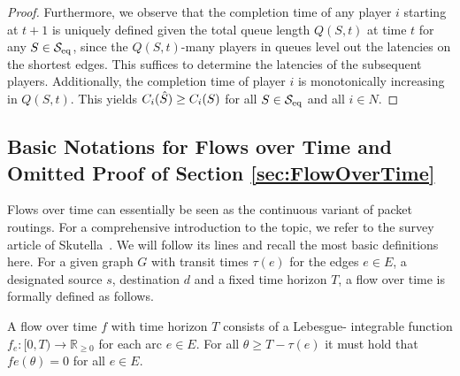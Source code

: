 \begin{proof}
\medskip
%
\noindent Furthermore, we observe that the completion time of any player $i$ starting at $t+1$ is uniquely defined given the total queue length $Q(S,t)$ at time $t$ for any $S\in \mathcal{S}_{\operatorname{eq}}$, since the $Q(S,t)$-many players in queues level out the latencies on the shortest edges. This suffices to determine the latencies of the subsequent players. Additionally, the completion time of player $i$ is monotonically increasing in $Q(S,t)$. This yields $C_i(\hat{S})\geq C_i(S)$ for all $S \in \mathcal{S}_{\operatorname{eq}}$ and all $i\in N$.
\end{proof}


\lemmaMnKStartpattern*
\noindent


\lemmaAddingEdges*
\noindent



\subsection{Basic Notations for Flows over Time and Omitted Proof of Section \ref{sec:FlowOverTime}}\label{app:FlowOverTime}

Flows over time can essentially be seen as the continuous variant of packet routings. For a comprehensive introduction to the topic, we refer to the survey article of Skutella~\cite{Skutella2009survey}. We will follow its lines and recall the most basic definitions here. For a given graph $G$ with transit times $\tau(e)$ for the edges $e \in E$, a designated source $s$, destination $d$ and a fixed time horizon $T$, a flow over time is formally defined as follows.

\begin{definition}
A flow over time $f$ with time horizon $T$ consists of a Lebesgue-
integrable function $f_e : [0, T) \rightarrow \mathbb{R}_{\geq 0}$ for each arc $e \in E$. For all $\theta \geq T - \tau(e)$ it must hold that $fe(\theta) = 0$ for all $e \in E$.
\end{definition}

